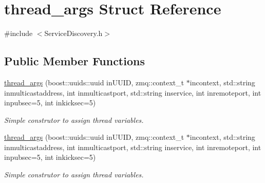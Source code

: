 \hypertarget{structthread__args}{\section{thread\-\_\-args Struct Reference}
\label{structthread__args}
}


{\ttfamily \#include $<$Service\-Discovery.\-h$>$}

\subsection*{Public Member Functions}
\begin{DoxyCompactItemize}
\item 
\hypertarget{structthread__args_a6b3383444ec19a7bd2969229e1b87d2f}{\hyperlink{structthread__args_a6b3383444ec19a7bd2969229e1b87d2f}{thread\-\_\-args} (boost\-::uuids\-::uuid in\-U\-U\-I\-D, zmq\-::context\-\_\-t $\ast$incontext, std\-::string inmulticastaddress, int inmulticastport, std\-::string inservice, int inremoteport, int inpubsec=5, int inkicksec=5)}\label{structthread__args_a6b3383444ec19a7bd2969229e1b87d2f}

\begin{DoxyCompactList}\small\item\em Simple construtor to assign thread variables. \end{DoxyCompactList}\item 
\hypertarget{structthread__args_a6b3383444ec19a7bd2969229e1b87d2f}{\hyperlink{structthread__args_a6b3383444ec19a7bd2969229e1b87d2f}{thread\-\_\-args} (boost\-::uuids\-::uuid in\-U\-U\-I\-D, zmq\-::context\-\_\-t $\ast$incontext, std\-::string inmulticastaddress, int inmulticastport, std\-::string inservice, int inremoteport, int inpubsec=5, int inkicksec=5)}\label{structthread__args_a6b3383444ec19a7bd2969229e1b87d2f}

\begin{DoxyCompactList}\small\item\em Simple construtor to assign thread variables. \end{DoxyCompactList}\end{DoxyCompactItemize}
